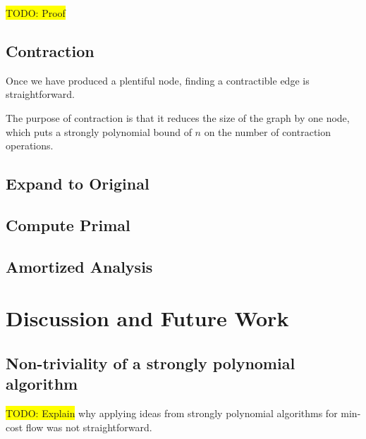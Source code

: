 \documentclass[11pt]{article}
\theoremstyle{definition}
\theoremstyle{definition}
\newcommand{\todo}[1]{\colorbox{yellow}{TODO: #1}}
\begin{document}
\todo{Proof}

\subsection{Contraction}

Once we have produced a plentiful node, finding a contractible edge is straightforward. 

The purpose of contraction is that it reduces the size of the graph by one node,
which puts a strongly polynomial bound of $n$ on the number of contraction
operations. 
\subsection{Expand to Original}
\subsection{Compute Primal}
\subsection{Amortized Analysis}





\section{Discussion and Future Work}

\subsection{Non-triviality of a strongly polynomial algorithm}

\todo{Explain} why applying ideas from strongly polynomial algorithms for
min-cost flow was not straightforward. 

\setlength{\bibitemsep}{0pt}
\nocite{*}
\printbibliography
\end{document}
